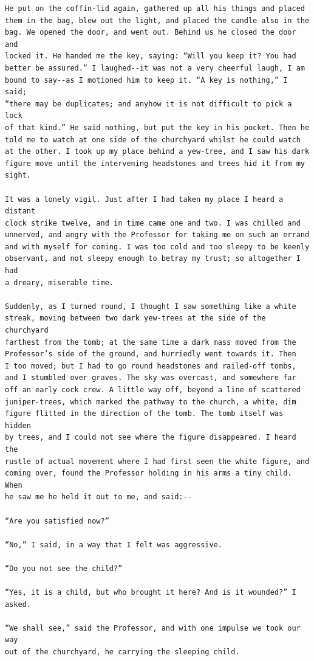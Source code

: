 \documentclass{article}
\begin{document}
\begin{verbatim}
He put on the coffin-lid again, gathered up all his things and placed
them in the bag, blew out the light, and placed the candle also in the
bag. We opened the door, and went out. Behind us he closed the door and
locked it. He handed me the key, saying: “Will you keep it? You had
better be assured.” I laughed--it was not a very cheerful laugh, I am
bound to say--as I motioned him to keep it. “A key is nothing,” I said;
“there may be duplicates; and anyhow it is not difficult to pick a lock
of that kind.” He said nothing, but put the key in his pocket. Then he
told me to watch at one side of the churchyard whilst he could watch
at the other. I took up my place behind a yew-tree, and I saw his dark
figure move until the intervening headstones and trees hid it from my
sight.

It was a lonely vigil. Just after I had taken my place I heard a distant
clock strike twelve, and in time came one and two. I was chilled and
unnerved, and angry with the Professor for taking me on such an errand
and with myself for coming. I was too cold and too sleepy to be keenly
observant, and not sleepy enough to betray my trust; so altogether I had
a dreary, miserable time.

Suddenly, as I turned round, I thought I saw something like a white
streak, moving between two dark yew-trees at the side of the churchyard
farthest from the tomb; at the same time a dark mass moved from the
Professor’s side of the ground, and hurriedly went towards it. Then
I too moved; but I had to go round headstones and railed-off tombs,
and I stumbled over graves. The sky was overcast, and somewhere far
off an early cock crew. A little way off, beyond a line of scattered
juniper-trees, which marked the pathway to the church, a white, dim
figure flitted in the direction of the tomb. The tomb itself was hidden
by trees, and I could not see where the figure disappeared. I heard the
rustle of actual movement where I had first seen the white figure, and
coming over, found the Professor holding in his arms a tiny child. When
he saw me he held it out to me, and said:--

“Are you satisfied now?”

“No,” I said, in a way that I felt was aggressive.

“Do you not see the child?”

“Yes, it is a child, but who brought it here? And is it wounded?” I
asked.

“We shall see,” said the Professor, and with one impulse we took our way
out of the churchyard, he carrying the sleeping child.


\end{verbatim}
\end{document}
